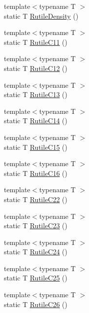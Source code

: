 \begin{DoxyCompactItemize}
\item 
{\footnotesize template$<$typename T $>$ }\\static T \mbox{\hyperlink{namespacempc_1_1data_a57ed7ae518121cb08486484a2131037f}{Rutile\+Density}} ()
\item 
{\footnotesize template$<$typename T $>$ }\\static T \mbox{\hyperlink{namespacempc_1_1data_afd6f2a6dfb90f0896ed3617974851c94}{Rutile\+C11}} ()
\item 
{\footnotesize template$<$typename T $>$ }\\static T \mbox{\hyperlink{namespacempc_1_1data_ad1d4e3e3a9d1d390a470fd61d871a4da}{Rutile\+C12}} ()
\item 
{\footnotesize template$<$typename T $>$ }\\static T \mbox{\hyperlink{namespacempc_1_1data_a98c812fbacef0cdbbd07a0523b48be08}{Rutile\+C13}} ()
\item 
{\footnotesize template$<$typename T $>$ }\\static T \mbox{\hyperlink{namespacempc_1_1data_a1fed6426b91f499773b52d97f8887e9f}{Rutile\+C14}} ()
\item 
{\footnotesize template$<$typename T $>$ }\\static T \mbox{\hyperlink{namespacempc_1_1data_a48f89f93780a83878dd72df54b3686e3}{Rutile\+C15}} ()
\item 
{\footnotesize template$<$typename T $>$ }\\static T \mbox{\hyperlink{namespacempc_1_1data_acc527852564f39e6aa0d8fdc3adbfc6d}{Rutile\+C16}} ()
\item 
{\footnotesize template$<$typename T $>$ }\\static T \mbox{\hyperlink{namespacempc_1_1data_a2c9ffb7a7bad769424d08349e230ba92}{Rutile\+C22}} ()
\item 
{\footnotesize template$<$typename T $>$ }\\static T \mbox{\hyperlink{namespacempc_1_1data_a230265afbf2e9e9fc43a2b89e17b7073}{Rutile\+C23}} ()
\item 
{\footnotesize template$<$typename T $>$ }\\static T \mbox{\hyperlink{namespacempc_1_1data_ade68205729af73507492aca8fc941d5b}{Rutile\+C24}} ()
\item 
{\footnotesize template$<$typename T $>$ }\\static T \mbox{\hyperlink{namespacempc_1_1data_a84a379b68d6a1c781f661ae0358475fa}{Rutile\+C25}} ()
\item 
{\footnotesize template$<$typename T $>$ }\\static T \mbox{\hyperlink{namespacempc_1_1data_abe937921a65b0efe4b06a8f0b7ef9220}{Rutile\+C26}} ()

\end{DoxyCompactItemize}

